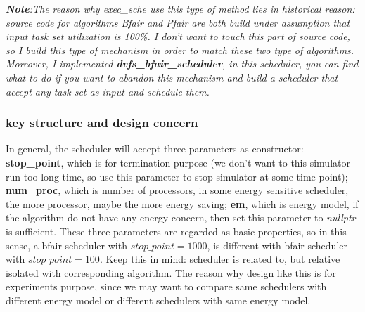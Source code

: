 \documentclass[11pt, oneside]{article}
\begin{document}
\textit{\textbf{Note}:The reason why \textit{exec\_sche} use this type of method lies in historical reason: source code for algorithms Bfair and Pfair are both build under assumption that input task set utilization is 100\%. I don't want to touch this part of source code, so I build this type of mechanism in order to match these two type of algorithms. Moreover, I implemented \textbf{dvfs\_bfair\_scheduler}, in this scheduler, you can find what to do if you want to abandon this mechanism and build a scheduler that accept any task set as input and schedule them. }

\subsubsection{key structure and design concern}
In general, the scheduler will accept three parameters as constructor: \textbf{stop\_point}, which is for termination purpose (we don't want to this simulator run too long time, so use this parameter to stop simulator at some time point); \textbf{num\_proc}, which is number of processors, in some energy sensitive scheduler, the more processor, maybe the more energy saving; \textbf{em}, which is energy model, if the algorithm do not have any energy concern, then set this parameter to \textit{nullptr} is sufficient. These three parameters are regarded as basic properties, so in this sense, a bfair scheduler with $stop\_point=1000$, is different with bfair scheduler with $stop\_point=100$. Keep this in mind: scheduler is related to, but relative isolated with corresponding algorithm. The reason why design like this is for experiments purpose, since we may want to compare same schedulers with different energy model or different schedulers with same energy model.\\
\end{document}
